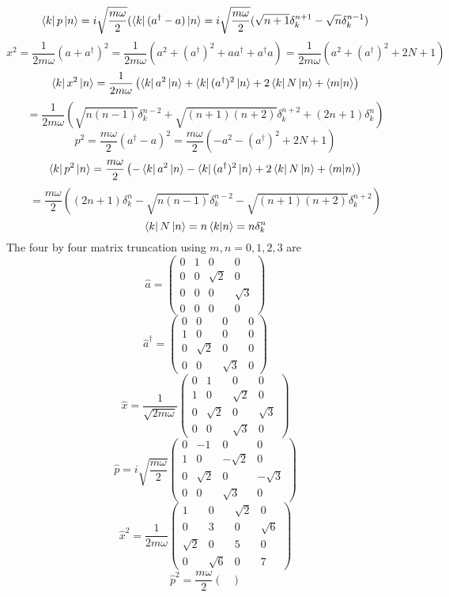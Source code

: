 \begin{sol}
\begin{enumerate}[label=\textbf{(\alph*)}]
$$\bra kp\ket n=i\sqrt{\frac{m\omega}{2}}(\bra k(a^\dagger-a)\ket n=i\sqrt{\frac{m\omega}{2}}(\sqrt{n+1}\delta_k^{n+1}-\sqrt n\delta_k^{n-1})$$
$$x^2=\frac{1}{2m\omega}(a+a^\dagger)^2=\frac{1}{2m\omega}(a^2+(a^\dagger)^2+aa^\dagger+a^\dagger a)=\frac{1}{2m\omega}(a^2+(a^\dagger)^2+2N+1)$$
$$\bra kx^2\ket n=\frac{1}{2m\omega}\left(\bra ka^2\ket n+\bra k(a^\dagger)^2\ket n+2\bra kN\ket n+\braket{m}{n}\right)$$
$$=\frac{1}{2m\omega}\left(\sqrt{n(n-1)}\delta_k^{n-2}+\sqrt{(n+1)(n+2)}\delta_k^{n+2}+(2n+1)\delta_k^n\right)$$ 
$$p^2=\frac{m\omega}{2}(a^\dagger-a)^2=\frac{m\omega}{2}(-a^2-(a^\dagger)^2+2N+1)$$
$$\bra kp^2\ket n=\frac{m\omega}{2}\left(-\bra ka^2\ket n-\bra k(a^\dagger)^2\ket n+2\bra kN\ket n+\braket{m}{n}\right)$$
$$=\frac{m\omega}{2}\left((2n+1)\delta_k^n-\sqrt{n(n-1)}\delta_k^{n-2}-\sqrt{(n+1)(n+2)}\delta_k^{n+2}\right)$$
$$\bra kN\ket n=n\braket{k}{n}=n\delta_k^n$$ 
The four by four matrix truncation using $m,n=0,1,2,3$ are 
$$\hat a=\begin{pmatrix}
0&1&0&0\\0&0&\sqrt{2}&0\\0&0&0&\sqrt{3}\\0&0&0&0
\end{pmatrix}$$ $$\hat a^\dagger=\begin{pmatrix}
0&0&0&0\\1&0&0&0\\0&\sqrt{2}&0&0\\0&0&\sqrt{3}&0
\end{pmatrix}$$
$$\hat x=\frac{1}{\sqrt{2m\omega}}\begin{pmatrix}
0&1&0&0\\1&0&\sqrt{2}&0\\0&\sqrt{2}&0&\sqrt{3}\\0&0&\sqrt{3}&0
\end{pmatrix}$$ 
$$\hat p=i\sqrt{\frac{m\omega}{2}}\begin{pmatrix}
0&-1&0&0\\1&0&-\sqrt{2}&0\\0&\sqrt{2}&0&-\sqrt{3}\\0&0&\sqrt{3}&0
\end{pmatrix}$$
$$\hat x^2=\frac{1}{2m\omega}\begin{pmatrix}
1&0&\sqrt{2}&0\\0&3&0&\sqrt{6}\\\sqrt{2}&0&5&0\\0&\sqrt{6}&0&7
\end{pmatrix}$$
$$\hat p^2=\frac{m\omega}{2}\begin{pmatrix}

\end{pmatrix}$$
\end{enumerate}
\end{sol}
